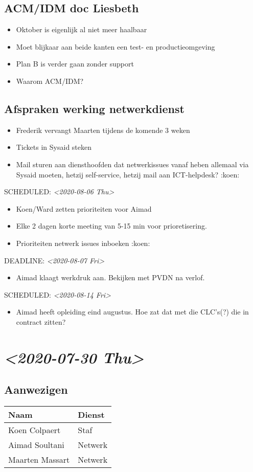\documentclass[11pt]{article}
\begin{document}
\subsection{ACM/IDM doc Liesbeth}
\label{sec:orga03e0cf}
\begin{itemize}
\item Oktober is eigenlijk al niet meer haalbaar
\item Moet blijkaar aan beide kanten een test- en productieomgeving
\item Plan B is verder gaan zonder support
\item Waarom ACM/IDM?
\end{itemize}
\subsection{Afspraken werking netwerkdienst}
\label{sec:org27511eb}
\begin{itemize}
\item Frederik vervangt Maarten tijdens de komende 3 weken
\item Tickets in Sysaid steken
\item Mail sturen aan diensthoofden dat netwerkissues vanaf heben allemaal via Sysaid moeten, hetzij self-service, hetzij mail aan ICT-helpdesk? :koen:
\end{itemize}
SCHEDULED: \textit{<2020-08-06 Thu>}
\begin{itemize}
\item Koen/Ward zetten prioriteiten voor Aimad
\item Elke 2 dagen korte meeting van 5-15 min voor prioretisering.
\item Prioriteiten netwerk issues inboeken :koen:
\end{itemize}
DEADLINE: \textit{<2020-08-07 Fri>}
\begin{itemize}
\item Aimad klaagt werkdruk aan. Bekijken met PVDN na verlof.
\end{itemize}
SCHEDULED: \textit{<2020-08-14 Fri>}
\begin{itemize}
\item Aimad heeft opleiding eind augustus. Hoe zat dat met die CLC's(?) die in contract zitten?
\end{itemize}

\section{\textit{<2020-07-30 Thu>}}
\label{sec:org5bc65ee}
\subsection{Aanwezigen}
\label{sec:org5643a32}
\begin{center}
\begin{tabular}{ll}
Naam & Dienst\\
\hline
Koen Colpaert & Staf\\
Aimad Soultani & Netwerk\\
Maarten Massart & Netwerk\\
\end{tabular}
\end{center}
\end{document}
